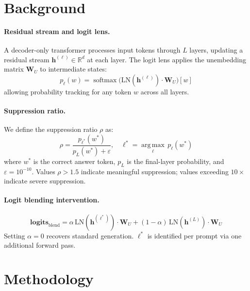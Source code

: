 \documentclass{article}
\begin{document}
\section{Background}

\paragraph{Residual stream and logit lens.}
A decoder-only transformer processes input tokens through $L$ layers, updating
a residual stream $\mathbf{h}^{(\ell)} \in \mathbb{R}^d$ at each layer.
The logit lens applies the unembedding matrix $\mathbf{W}_U$ to intermediate
states:
\begin{equation}
p_\ell(w) = \operatorname{softmax}
  \!\bigl(\mathrm{LN}(\mathbf{h}^{(\ell)}) \cdot \mathbf{W}_U\bigr)[w]
\label{eq:logitlens}
\end{equation}
allowing probability tracking for any token $w$ across all layers.

\paragraph{Suppression ratio.}
We define the suppression ratio $\rho$ as:
\begin{equation}
\rho = \frac{p_{\ell^*}(w^*)}{p_L(w^*) + \varepsilon}, \quad
\ell^* = \operatorname*{arg\,max}_\ell\, p_\ell(w^*)
\label{eq:rho}
\end{equation}
where $w^*$ is the correct answer token, $p_L$ is the final-layer probability,
and $\varepsilon = 10^{-10}$.
Values $\rho > 1.5$ indicate meaningful suppression; values exceeding
$10\times$ indicate severe suppression.

\paragraph{Logit blending intervention.}
\begin{equation}
\mathbf{logits}_{\mathrm{blend}}
  = \alpha\,\mathrm{LN}(\mathbf{h}^{(\ell^*)}) \cdot \mathbf{W}_U
  + (1-\alpha)\,\mathrm{LN}(\mathbf{h}^{(L)}) \cdot \mathbf{W}_U
\label{eq:blend}
\end{equation}
Setting $\alpha=0$ recovers standard generation. $\ell^*$ is identified per
prompt via one additional forward pass.

\section{Methodology}
\end{document}
